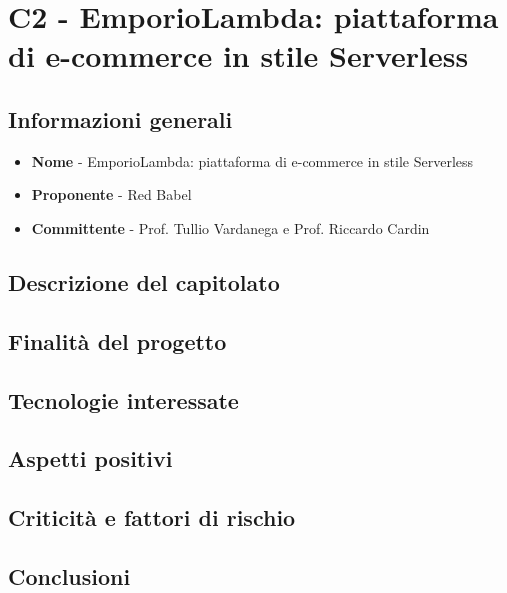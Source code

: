 \chapter{C2 - EmporioLambda: piattaforma di e-commerce in stile Serverless}
\section{Informazioni generali}
\begin{itemize}
	\item \textbf{Nome} - EmporioLambda: piattaforma di e-commerce in stile Serverless
	\item \textbf{Proponente} - Red Babel
	\item \textbf{Committente} - Prof. Tullio Vardanega e Prof. Riccardo Cardin
\end{itemize}
\section{Descrizione del capitolato}

\section{Finalità del progetto}
\section{Tecnologie interessate}
\section{Aspetti positivi}
\section{Criticità e fattori di rischio}
\section{Conclusioni}